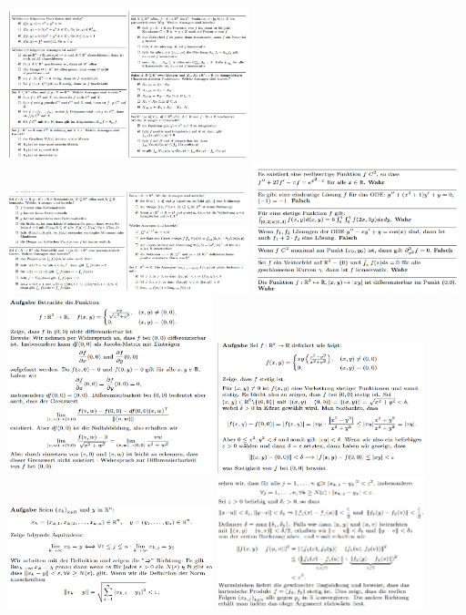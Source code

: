\documentclass[8pt]{extarticle}
\begin{document}
\begin{multicols*}{3}
\begin{center}
  \includegraphics[width=7cm]{multiplechoice1.png} 
  \includegraphics[width=7cm]{multiplechoice2.png} 
  \includegraphics[width=6cm]{multiplechoice3.png} 
  \includegraphics[width=6cm]{ex1.png} 
  \includegraphics[width=6cm]{ex2.png} 
  \includegraphics[width=6cm]{ex3_1.png} 
  \includegraphics[width=6cm]{ex3_2.png} 
\end{center}




\end{multicols*}
\end{document}
